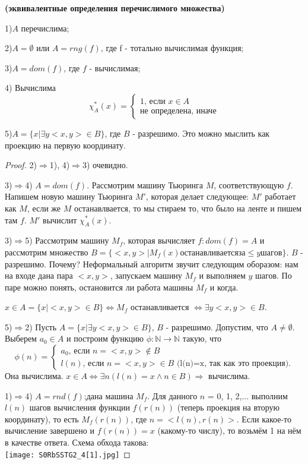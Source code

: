 \begin{theorem}{\textbf{(эквивалентные определения перечислимого множества)}}
	\par 1)$A$ перечислима;
	\par 2)$A = \emptyset $ или $A = rng(f)$, где f - тотально вычислимая функция;
	\par 3)$A = dom(f)$, где $f$ - вычислимая;
	\par 4) Вычислима \begin{equation*}
		\chi^*_{A}(x) = 
		\begin{cases}
			\text{1, если $x \in A$}\\
			\text{не определена, иначе}
		\end{cases}
	\end{equation*}
	\par 5)$A = \{ x| \exists y <x,y> \in B \}$, где $B$ - разрешимо. Это можно мыслить как проекцию на первую координату.
	\begin{proof}

		\par2)$\Rightarrow$1), 4)$\Rightarrow$3) очевидно.
		\par3)$\Rightarrow$4) $A=dom(f)$. Рассмотрим машину Тьюринга $M$, соответствующую $f$. Напишем новую машину
		Тьюринга $M'$, которая делает следующее: $M'$ работает как $M$, если же $M$ останавлвается, то мы стираем то,
		что было на ленте и пишем там $f$. $M'$ вычислит $\chi^*_{A}(x)$.  
		\par3)$\Rightarrow$5) Рассмотрим машину $M_{f}$, которая вычисляет $f: dom(f)=A$ и рассмотрим множество $B =
		\{<x,y>| M_{f}(x) останавливается за \leq y шагов \}$. $B$ - разрешимо. Почему? Неформальный алгоритм звучит
		следующим оборазом: нам на входе дана пара $<x,y>$, запускаем машину $M_{f}$ и выполняем $y$ шагов. По паре
		можно понять, остановится ли работа машины $M_{f}$ и когда.
		\par $x \in A = \{ x| <x,y> \in B \} \iff M_{f}$ останавливается $\iff \exists y <x,y> \in B $.
		\par5)$\Rightarrow$2) Пусть $A = \{ x| \exists y <x,y> \in B \}$, $B$ - разрешимо. Допустим, что $A \neq
		\emptyset$. Выберем $a_{0} \in A$ и построим функцию $\phi: \mathbb{N} \to \mathbb{N}$ такую, что 
		\begin{equation*}
			\phi(n) = 
			\begin{cases}
				a_{0}\text{, если $n=<x,y> \notin B$}\\
				l(n)\text{, если $n=<x,y> \in B$ (l(n)=x, так как это проекция)}.
			\end{cases}
		\end{equation*}
		Она вычислима. $x \in A \iff \exists n (l(n)=x \land n \in B) \Rightarrow$ вычислима.
		\par1)$\Rightarrow$4) $A = rnd(f)$;дана машина $M_{f}$. Для данного $n$ = 0, 1, 2,... выполним $l(n)$ шагов
		вычисления функции $f(r(n))$ (теперь проекция на вторую координату), то есть $M_{f}(r(n))$, где $n = <l(n),
		r(n)>$. Если какое-то вычисление завершено и $f(r(n))=x$ (какому-то числу), то возьмём 1 на нём в качестве
		ответа. Схема обхода такова: \\ 
		\texttt{[image: S0RbSSTG2\_4[1].jpg]}
	\end{proof}
\end{theorem}
